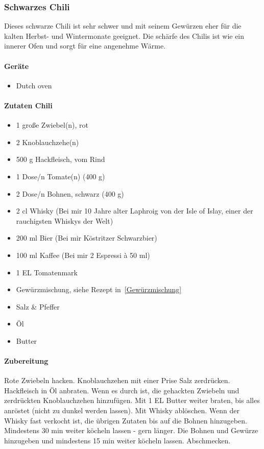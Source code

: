\subsubsection{Schwarzes Chili}
Dieses schwarze Chili ist sehr schwer und mit seinem Gewürzen eher für die 
kalten Herbst- und Wintermonate geeignet. Die schärfe des Chilis ist wie ein 
innerer Ofen und sorgt für eine angenehme Wärme.

\paragraph{Geräte}

\begin{itemize}[noitemsep]
	\item Dutch oven
\end{itemize}

\paragraph{Zutaten Chili}

\begin{itemize}[noitemsep]
	\item 1 große Zwiebel(n), rot
	\item 2 Knoblauchzehe(n)
	\item 500 g Hackfleisch, vom Rind
	\item 1 Dose/n Tomate(n) (400 g)
	\item 2 Dose/n Bohnen, schwarz (400 g)
	\item 2 cl Whisky (Bei mir 10 Jahre alter Laphroig von der Isle of Islay, einer 
	der rauchigsten Whiskys der Welt)
	\item 200 ml Bier (Bei mir Köstritzer Schwarzbier)
	\item 100 ml Kaffee (Bei mir 2 Espressi à 50 ml)
	\item 1 EL	Tomatenmark
	\item Gewürzmischung, siehe Rezept in~\vref{Gewürzmischung}
	\item Salz \& Pfeffer
	\item Öl
	\item Butter
\end{itemize}



\paragraph{Zubereitung}

Rote Zwiebeln hacken. Knoblauchzehen mit einer Prise Salz zerdrücken. 
Hackfleisch in Öl anbraten. Wenn es durch ist, die gehackten Zwiebeln und 
zerdrückten 
Knoblauchzehen hinzufügen. Mit 1 EL Butter weiter braten, bis alles anröstet 
(nicht zu dunkel werden lassen). Mit Whisky ablöschen. Wenn der Whisky fast 
verkocht 
ist, die übrigen Zutaten bis auf die Bohnen hinzugeben. Mindestens 30 min 
weiter köcheln lassen - gern länger. Die Bohnen und Gewürze hinzugeben und 
mindestens
15 min weiter köcheln lassen. Abschmecken.

